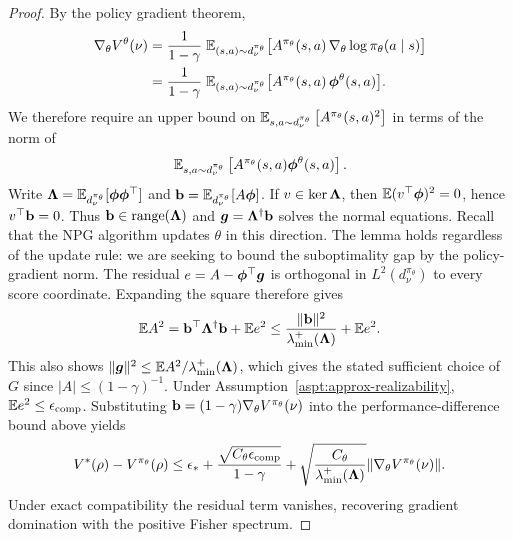 \begin{proof}
    By the policy gradient theorem,
    \[\begin{aligned}
\nabla_\theta V^{\theta}(\nu)&=\frac{1}{1-\gamma}\; \Bbb E_{(s,a)\sim d_\nu^{\pi_\theta}} \bigl[A^{\pi_\theta}(s,a)\,\nabla_\theta\log\pi_\theta(a\mid s)\bigr]\\
&= \frac{1}{1-\gamma}\; \Bbb E_{(s,a)\sim d_\nu^{\pi_\theta}} \bigl[A^{\pi_\theta}(s,a)\, \boldsymbol{\phi}^\theta(s,a)\bigr].
\end{aligned}\]
    We therefore require an upper bound on $\mathbb{E}_{s,a \sim d_\nu^{\pi_\theta}}\left[A^{\pi_\theta}(s,a)^2\right]$ in terms of the norm of \[\mathbb{E}_{s,a \sim d_\nu^{\pi_\theta}}\left[A^{\pi_\theta}(s,a) \boldsymbol{\phi}^\theta(s,a)\right].\]
    Write $\boldsymbol{\Lambda}=\mathbb{E}_{d_\nu^{\pi_\theta}}[\boldsymbol{\phi}\boldsymbol{\phi}^\top]$ and
$\mathbf{b}=\mathbb{E}_{d_\nu^{\pi_\theta}}[A\boldsymbol{\phi}]$. If $v\in\ker\boldsymbol{\Lambda}$, then
$\mathbb{E}(v^\top\boldsymbol{\phi})^2=0$, hence $v^\top\mathbf{b}=0$. Thus
$\mathbf{b}\in\operatorname{range}(\boldsymbol{\Lambda})$ and
$\bm{g}=\boldsymbol{\Lambda}^\dagger\mathbf{b}$ solves the normal equations.
Recall that the NPG algorithm updates $\theta$ in this direction. The lemma holds regardless of the update rule: we are seeking to bound the suboptimality gap by the policy-gradient norm.
The residual $e=A-\boldsymbol{\phi}^\top\bm{g}$ is orthogonal in $L^2(d_\nu^{\pi_\theta})$
to every score coordinate. Expanding the square therefore gives
\[
\mathbb{E} A^2=\mathbf{b}^\top\boldsymbol{\Lambda}^\dagger\mathbf{b}+\mathbb{E} e^2
\leq\frac{\|\mathbf{b}\|^2}{\lambda_{\min}^+(\boldsymbol{\Lambda})}+\mathbb{E} e^2.
\]
This also shows $\|\bm{g}\|^2\leq\mathbb{E} A^2/\lambda_{\min}^+(\boldsymbol{\Lambda})$,
which gives the stated sufficient choice of $G$ since $|A|\leq(1-\gamma)^{-1}$.
Under Assumption~\ref{aspt:approx-realizability}, $\mathbb{E} e^2\leq\epsilon_{\mathrm{comp}}$.
Substituting $\mathbf{b}=(1-\gamma)\nabla_\theta V^{\pi_\theta}(\nu)$ into the
performance-difference bound above yields
\[
V^*(\rho)-V^{\pi_\theta}(\rho)
\leq\epsilon_*+\frac{\sqrt{C_\theta\epsilon_{\mathrm{comp}}}}{1-\gamma}+\sqrt{\frac{C_\theta}{\lambda_{\min}^+(\boldsymbol{\Lambda})}}
\|\nabla_\theta V^{\pi_\theta}(\nu)\|.
\]
Under exact compatibility the residual term vanishes, recovering gradient
domination with the positive Fisher spectrum.
\end{proof}

